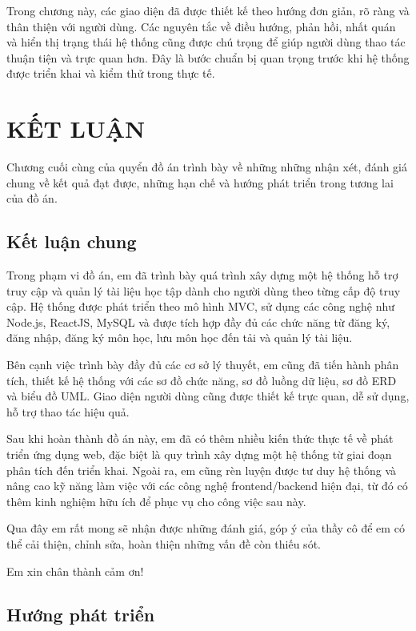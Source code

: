 \documentclass{article}
\begin{document}
	 Trong chương này, các giao diện đã được thiết kế theo hướng đơn giản, rõ ràng và thân thiện với người dùng. Các nguyên tắc về điều hướng, phản hồi, nhất quán và hiển thị trạng thái hệ thống cũng được chú trọng để giúp người dùng thao tác thuận tiện và trực quan hơn. Đây là bước chuẩn bị quan trọng trước khi hệ thống được triển khai và kiểm thử trong thực tế.
	 
	 \newpage
	 
	 \section*{KẾT LUẬN}
	 
	 Chương cuối cùng của quyển đồ án trình bày về những những nhận xét, đánh giá chung về kết quả đạt được, những hạn chế và hướng phát triển trong tương lai của đồ án.
	 
	 \subsection*{Kết luận chung}
	 
	 Trong phạm vi đồ án, em đã trình bày quá trình xây dựng một hệ thống hỗ trợ truy cập và quản lý tài liệu học tập dành cho người dùng theo từng cấp độ truy cập. Hệ thống được phát triển theo mô hình MVC, sử dụng các công nghệ như Node.js, ReactJS, MySQL và được tích hợp đầy đủ các chức năng từ đăng ký, đăng nhập, đăng ký môn học, lưu môn học đến tải và quản lý tài liệu.
	 
	 Bên cạnh việc trình bày đầy đủ các cơ sở lý thuyết, em cũng đã tiến hành phân tích, thiết kế hệ thống với các sơ đồ chức năng, sơ đồ luồng dữ liệu, sơ đồ ERD và biểu đồ UML. Giao diện người dùng cũng được thiết kế trực quan, dễ sử dụng, hỗ trợ thao tác hiệu quả.
	 
	 Sau khi hoàn thành đồ án này, em đã có thêm nhiều kiến thức thực tế về phát triển ứng dụng web, đặc biệt là quy trình xây dựng một hệ thống từ giai đoạn phân tích đến triển khai. Ngoài ra, em cũng rèn luyện được tư duy hệ thống và nâng cao kỹ năng làm việc với các công nghệ frontend/backend hiện đại, từ đó có thêm kinh nghiệm hữu ích để phục vụ cho công việc sau này.
	 
	 Qua đây em rất mong sẽ nhận được những đánh giá, góp ý của thầy cô để em có thể cải thiện, chỉnh sửa, hoàn thiện những vấn đề còn thiếu sót.
	 
	 Em xin chân thành cảm ơn!
	 
	 \subsection*{Hướng phát triển}
	 
\end{document}
